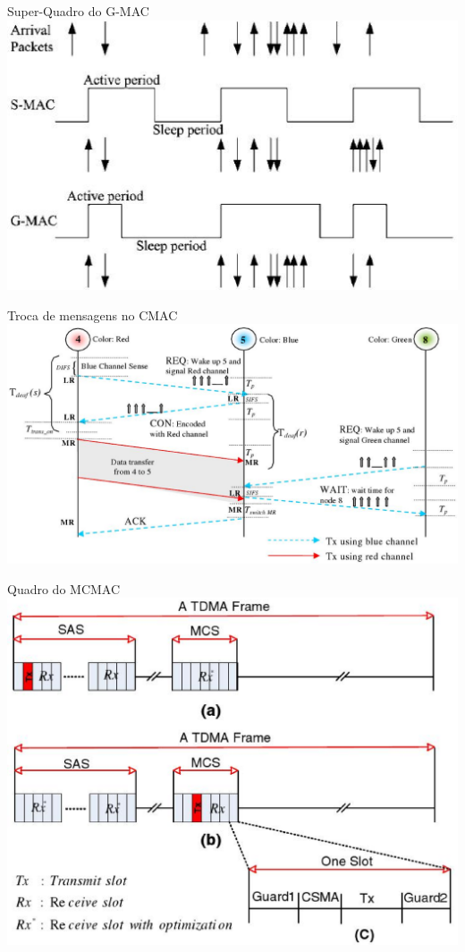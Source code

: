 \documentclass{beamer}
\begin{document}
\begin{frame}{Super-Quadro do G-MAC \cite{20093112234782} \hyperlink{quadro_g-mac_back}{}}
\hypertarget{quadro_g-mac}{}
\includegraphics[scale=0.5]{imagens/quadro_g-mac}
\end{frame}

\begin{frame}{Troca de mensagens no CMAC \cite{20084511683228} \hyperlink{cmac_back}{}}
\hypertarget{cmac}{}
\includegraphics[scale=0.3]{imagens/cmac}
\end{frame}

\begin{frame}{Quadro do MCMAC \cite{20103113115754} \hyperlink{mcmac_back}{}}
\hypertarget{mcmac}{}
\includegraphics[scale=0.3]{imagens/mcmac}
\end{frame}
\end{document}
